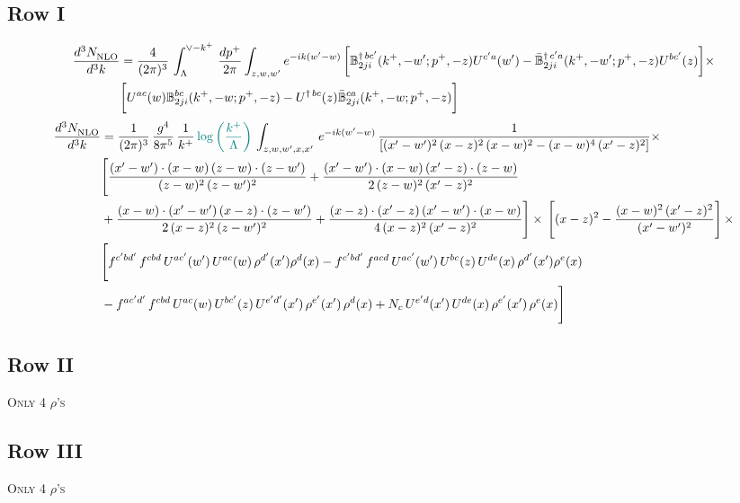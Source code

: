 \documentclass[9pt]{article}
\def\mf#1{\mathbb{#1}}
\numberwithin{equation}{section}
\begin{document}
\subsection{Row I}
\begin{align}
    \frac{d^{3}N_{\rm NLO}^{\rm}}{d^{3}k}  & = \frac{4}{(2\pi)^{3}}\,\int_{\Lambda}^{\vee-k^{+}}\, \frac{dp^{+}}{2\pi}\int_{z,w,w^{\prime}} e^{-ik(w^{\prime}-w)}\, \bigg[\mf{B}^{\dagger\, bc^{\prime}}_{2ji}(k^{+},-w^{\prime};p^{+},-z)U^{ c^{\prime}a}(w^{\prime}) -\Bar{\mf{B}}^{\dagger\, c^{\prime}a}_{2ji}(k^{+},-w^{\prime}; p^{+},-z)U^{bc^{\prime}}(z)\bigg]\times\notag \\ & \bigg[U^{ac}(w) \mf{B}^{bc}_{2ji}(k^{+},-w;p^{+},-z) -U^{\dagger\, bc}(z)\Bar{\mf{B}}^{ca}_{2ji}(k^{+},-w; p^{+},-z)\bigg]\nonumber
\end{align}
\begin{align}
 \frac{d^{3}N_{\rm NLO}^{\rm}}{d^{3}k}  & =     \frac{1}{(2\pi)^{3}}\, \frac{g^{4}}{8\pi^{5}}\,\frac{1}{k^{+}}\,{\color{teal}\log{\left(\frac{k^{+}}{\Lambda}\right)}}\,\int_{z,w,w^{\prime},x,x'}\, e^{-ik(w^{\prime}-w)}\, \frac{1}{\left[(x'-w')^{2}\,(x-z)^{2}\,(x-w)^{2} - (x-w)^{4}\, (x'-z)^{2}\right]} \times\notag \\ & \Bigg[\frac{(x'-w')\cdot (x-w)\, (z-w)\cdot (z-w')}{(z-w)^{2}\, (z-w')^{2}}+\frac{(x'-w')\cdot (x-w)\, (x'-z)\cdot (z-w)}{2\, (z-w)^{2}\, (x'-z)^{2}}\notag \\ & +\frac{(x-w)\cdot (x'-w')\, (x-z)\cdot (z-w')}{2\, (x-z)^{2}\, (z-w')^{2}}+\frac{(x-z)\cdot (x'-z)\, (x'-w')\cdot (x-w)}{4\, (x-z)^{2}\, (x'-z)^{2}}\Bigg] \times\,\Bigg[(x-z)^{2} - \frac{(x-w)^{2}\, (x'-z)^{2}}{(x'-w')^{2}}\Bigg]\,\times \notag \\ & \Bigg[f^{c'bd'}\,f^{cbd}\, U^{ac'}(w')\,U^{ac}(w)\,\rho^{d'}(x')\rho^{d}(x)- f^{c'bd'}\,f^{acd}\,U^{ac'}(w')\,U^{bc}(z)\,U^{de}(x)\,\rho^{d'}(x')\rho^{e}(x) \notag \\ & -f^{ac'd'}\,f^{cbd}\,U^{ac}(w)\,U^{bc'}(z)\,U^{e'd'}(x')\,\rho^{e'}(x')\,\rho^{d}(x) +N_{c}\,U^{e'd}(x')\,U^{de}(x)\,\rho^{e'}(x')\,\rho^{e}(x)\Bigg]
\end{align}
\subsection{Row II}
\textsc{Only 4 $\rho$'s}
\subsection{Row III}
\textsc{Only 4 $\rho$'s}
\end{document}
